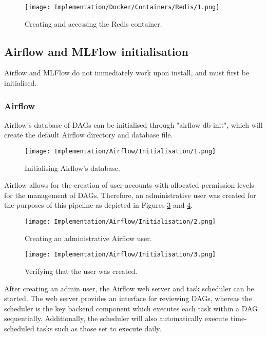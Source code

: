 \begin{figure}[H]
    \centering
    \texttt{[image: Implementation/Docker/Containers/Redis/1.png]}
    \caption{Creating and accessing the Redis container.}
    \label{fig:CreateRedis}
\end{figure}


\subsection{Airflow and MLFlow initialisation}
Airflow and MLFlow do not immediately work upon install, and must first be initialised.

\subsubsection{Airflow}
Airflow's database of DAGs can be initialised through "airflow db init", which will create 
the default Airflow directory and database file.

\begin{figure}[H]
    \centering
    \texttt{[image: Implementation/Airflow/Initialisation/1.png]}
    \caption{Initialising Airflow's database.}
    \label{fig:AirflowInit}
\end{figure}

\noindent Airflow allows for the creation of user accounts with allocated permission levels for the management of 
DAGs. Therefore, an administrative user was created for the purposes of this pipeline as depicted in Figures 
\ref{fig:AirflowUser1} and \ref{fig:AirflowUser2}.

\begin{figure}[H]
    \centering
    \texttt{[image: Implementation/Airflow/Initialisation/2.png]}
    \caption{Creating an administrative Airflow user.}
    \label{fig:AirflowUser1}
\end{figure}

\begin{figure}[H]
    \centering
    \texttt{[image: Implementation/Airflow/Initialisation/3.png]}
    \caption{Verifying that the user was created.}
    \label{fig:AirflowUser2}
\end{figure}

\noindent After creating an admin user, the Airflow web server and task scheduler can be started. The web server provides 
an interface for reviewing DAGs, whereas the scheduler is the key backend component which executes each task within a 
DAG sequentially. Additionally, the scheduler will also automatically execute time-scheduled tasks such as those set to 
execute daily.

